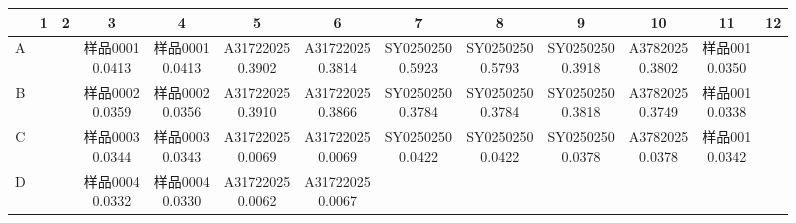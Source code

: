 \documentclass[UTF8,10pt,a4paper,fontset=fandol]{ctexart}
\begin{document}
\begin{center}
\scriptsize
\begin{tabular}{|c|c|c|c|c|c|c|c|c|c|c|c|c|}
\hline
 & 1 & 2 & 3 & 4 & 5 & 6 & 7 & 8 & 9 & 10 & 11 & 12\\
\hline
A & & & \shortstack{样品0001\\0.0413} & \shortstack{样品0001\\0.0413} &
\shortstack{A31722025\\0.3902} & \shortstack{A31722025\\0.3814} &
\shortstack{SY0250250\\0.5923} & \shortstack{SY0250250\\0.5793} &
\shortstack{SY0250250\\0.3918} & \shortstack{A3782025\\0.3802} &
\shortstack{样品001\\0.0350} & \\
\hline
B & & & \shortstack{样品0002\\0.0359} & \shortstack{样品0002\\0.0356} &
\shortstack{A31722025\\0.3910} & \shortstack{A31722025\\0.3866} &
\shortstack{SY0250250\\0.3784} & \shortstack{SY0250250\\0.3784} &
\shortstack{SY0250250\\0.3818} & \shortstack{A3782025\\0.3749} &
\shortstack{样品001\\0.0338} & \\
\hline
C & & & \shortstack{样品0003\\0.0344} & \shortstack{样品0003\\0.0343} &
\shortstack{A31722025\\0.0069} & \shortstack{A31722025\\0.0069} &
\shortstack{SY0250250\\0.0422} & \shortstack{SY0250250\\0.0422} &
\shortstack{SY0250250\\0.0378} & \shortstack{A3782025\\0.0378} &
\shortstack{样品001\\0.0342} & \\
\hline
D & & & \shortstack{样品0004\\0.0332} & \shortstack{样品0004\\0.0330} &
\shortstack{A31722025\\0.0062} & \shortstack{A31722025\\0.0067} &

\end{tabular}
\end{center}
\end{document}
